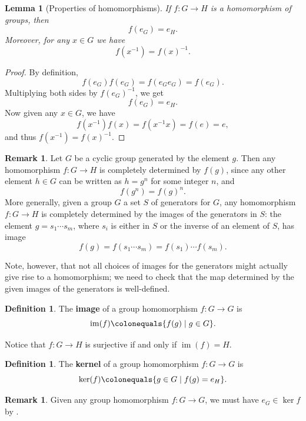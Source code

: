 \documentclass[12pt]{report}
\newtheorem{lemma}[theorem]{Lemma}
\numberwithin{equation}{section}
\numberwithin{theorem}{chapter}
\theoremstyle{definition}
\newtheorem{definition}[theorem]{Definition}
\newtheorem*{basic properties}{Basic Properties}
\newtheorem*{Important Remark}{Important Remark}
\newtheorem{remark}[theorem]{Remark}
\newcommand{\df}[1]{{\bf #1}\index{#1}}
\renewcommand{\ker}{\operatorname{ker}}
\DeclareMathOperator{\im}{im}
\begin{document}
\begin{lemma}[Properties of homomorphisms]\label{homomorphisms send 1 to 1}
	If $f: G \to H$ is a homomorphism of groups, then 
	$$f(e_G) = e_H.$$
	Moreover, for any $x \in G$ we have
	$$f(x^{-1}) = f(x)^{-1}.$$
\end{lemma}


\begin{proof}
By definition,
$$f(e_G)f(e_G) = f(e_Ge_G) = f(e_G).$$ 
Multiplying both sides by $f(e_G)^{-1}$, we get
$$f(e_G) = e_H.$$
Now given any $x \in G$, we have
$$f(x^{-1}) f(x) = f(x^{-1}x) = f(e) = e,$$ 
and thus $f(x^{-1}) = f(x)^{-1}$.
\end{proof}



\begin{remark}\label{homomorphism determined by generators}
Let $G$ be a cyclic group generated by the element $g$. Then any homomorphism $f\!: G \to H$ is completely determined by $f(g)$, since any other element $h \in G$ can be written as $h = g^n$ for some integer $n$, and
$$f(g^n) = f(g)^n.$$
More generally, given a group $G$ a set $S$ of generators for $G$, any homomorphism $f\!: G \longrightarrow H$ is completely determined by the images of the generators in $S$: the element $g = s_1 \cdots s_m$, where $s_i$ is either in $S$ or the inverse of an element of $S$, has image
$$f(g) = f(s_1 \cdots s_m) = f(s_1) \cdots f(s_m).$$

Note, however, that not all choices of images for the generators might actually give rise to a homomorphism; we need to check that the map determined by the given images of the generators is well-defined.
\end{remark}


\begin{definition}\index{$\ker(f)$}
The \df{image} of a group homomorphism $f\!: G \longrightarrow G$ is 
$$\im(f) \colonequals \{f(g) \mid g \in G \}.$$
\end{definition}

Notice that $f\!: G \to H$ is surjective if and only if $\im(f) = H$.


\begin{definition}\index{$\ker(f)$}
The \df{kernel} of a group homomorphism $f\!: G \longrightarrow G$ is 
$$\ker(f) \colonequals \{g \in G \mid f(g) = e_H\}.$$
\end{definition}

\begin{remark}
Given any group homomorphism $f\!: G \longrightarrow G$, we must have $e_G \in \ker f$ by .
\end{remark}
\end{document}
